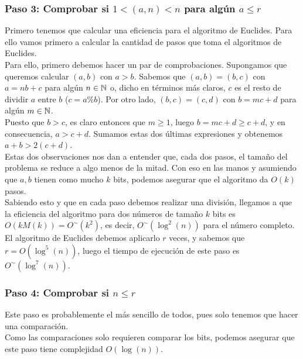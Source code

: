 \subsubsection{Paso 3: Comprobar si $1 < (a, n) < n$ para algún $a \leq r$}

Primero tenemos que calcular una eficiencia para el algoritmo de Euclides. Para ello vamos primero a calcular la cantidad de pasos que toma el algoritmos de Euclides.\\

Para ello, primero debemos hacer un par de comprobaciones. Supongamos que queremos calcular $(a, b)$ con $a > b$. Sabemos que $(a, b) = (b, c)$ con $a = nb + c$ para algún $n \in \mathbb{N}$ o, dicho en términos más claros, $c$ es el resto de dividir $a$ entre $b$ ($c = a \% b$). Por otro lado, $(b, c) = (c, d)$ con $b = mc + d$ para algún $m \in \mathbb{N}$.\\

Puesto que $b > c$, es claro entonces que $m \geq 1$, luego $b = mc + d \geq c + d$, y en consecuencia, $a > c + d$. Sumamos estas dos últimas expresiones y obtenemos $a + b > 2(c + d)$.\\

Estas dos observaciones nos dan a entender que, cada dos pasos, el tamaño del problema se reduce a algo menos de la mitad. Con eso en las manos y asumiendo que $a, b$ tienen como mucho $k$ bits, podemos asegurar que el algoritmo da $O(k)$ pasos.\\

Sabiendo esto y que en cada paso debemos realizar una división, llegamos a que la eficiencia del algoritmo para dos números de tamaño $k$ bits es $O(kM(k)) = O^\sim(k^2)$, es decir, $O^\sim(\log^2(n))$ para el número completo.\\

El algoritmo de Euclides debemos aplicarlo $r$ veces, y sabemos que $r = O(\log^5(n))$, luego el tiempo de ejecución de este paso es $O^\sim(\log^7(n))$.

\subsubsection{Paso 4: Comprobar si $n \leq r$}

Este paso es probablemente el más sencillo de todos, pues solo tenemos que hacer una comparación.\\

Como las comparaciones solo requieren comparar los bits, podemos asegurar que este paso tiene complejidad $O(\log(n))$.

